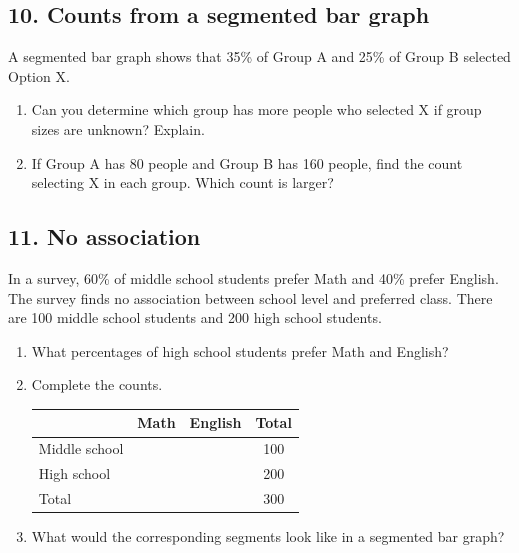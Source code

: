 \documentclass[11pt]{article}
\begin{document}
\subsection*{10. Counts from a segmented bar graph}
A segmented bar graph shows that 35\% of Group A and 25\% of Group B selected Option X.
\begin{enumerate}[label=\alph*.]
  \item Can you determine which group has more people who selected X if group sizes are unknown? Explain.\\[0.28in]
  \item If Group A has 80 people and Group B has 160 people, find the count selecting X in each group. Which count is larger?\\[0.32in]
\end{enumerate}

\subsection*{11. No association}
In a survey, 60\% of middle school students prefer Math and 40\% prefer English. The survey finds no association between school level and preferred class. There are 100 middle school students and 200 high school students.
\begin{enumerate}[label=\alph*.]
  \item What percentages of high school students prefer Math and English?\\[0.2in]
  \item Complete the counts.
  \begin{center}
  \begin{tabular}{l|cc|c}
   & Math & English & Total\\ \hline
  Middle school & \hspace{0.7in} & \hspace{0.7in} & 100\\
  High school & & & 200\\ \hline
  Total & & & 300
  \end{tabular}
  \end{center}
  \item What would the corresponding segments look like in a segmented bar graph?\\[0.25in]
\end{enumerate}

\Needspace{2.2in}
\end{document}
